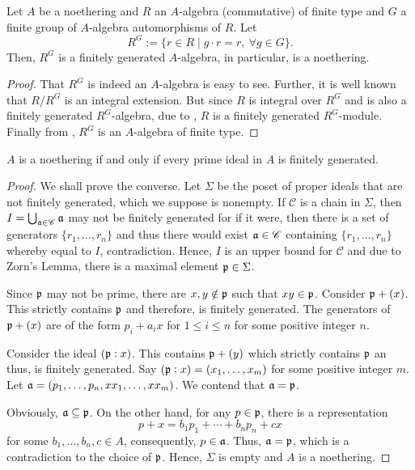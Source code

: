 \begin{corollary}[Noether]
    Let $A$ be a noethering and $R$ an $A$-algebra (commutative) of finite type and $G$ a finite group of $A$-algebra automorphisms of $R$. Let 
    \begin{equation*}
        R^G := \{r\in R\mid g\cdot r = r,~\forall g\in G\}.
    \end{equation*}
    Then, $R^G$ is a finitely generated $A$-algebra, in particular, is a noethering.
\end{corollary}
\begin{proof}
    That $R^G$ is indeed an $A$-algebra is easy to see. Further, it is well known that $R/R^G$ is an integral extension. But since $R$ is integral over $R^G$ and is also a finitely generated $R^G$-algebra, due to , $R$ is a finitely generated $R^G$-module. Finally from , $R^G$ is an $A$-algebra of finite type.
\end{proof}

\begin{lemma}[Cohen]
    $A$ is a noethering if and only if every prime ideal in $A$ is finitely generated.
\end{lemma}
\begin{proof}
    We shall prove the converse. Let $\Sigma$ be the poset of proper ideals that are not finitely generated, which we suppose is nonempty. If $\mathscr C$ is a chain in $\Sigma$, then $I = \bigcup_{\mathfrak a\in\mathscr C}\mathfrak a$ may not be finitely generated for if it were, then there is a set of generators $\{r_1,\ldots,r_n\}$ and thus there would exist $\mathfrak a\in\mathscr C$ containing $\{r_1,\ldots,r_n\}$ whereby equal to $I$, contradiction. Hence, $I$ is an upper bound for $\mathscr C$ and due to Zorn's Lemma, there is a maximal element $\mathfrak p\in\Sigma$.

    Since $\mathfrak p$ may not be prime, there are $x,y\notin\mathfrak p$ such that $xy\in\mathfrak p$. Consider $\mathfrak p + (x)$. This strictly contains $\mathfrak p$ and therefore, is finitely generated. The generators of $\mathfrak p + (x)$ are of the form $p_i + a_ix$ for $1\le i\le n$ for some positive integer $n$. 

    Consider the ideal $(\mathfrak p: x)$. This contains $\mathfrak p + (y)$ which strictly contains $\mathfrak p$ an thus, is finitely generated. Say $(\mathfrak p: x) = (x_1,\ldots,x_m)$ for some positive integer $m$. Let $\mathfrak a = (p_1,\ldots,p_n,xx_1,\ldots,xx_m)$. We contend that $\mathfrak a = \mathfrak p$.

    Obviously, $\mathfrak a\subseteq\mathfrak p$. On the other hand, for any $p\in\mathfrak p$, there is a representation 
    \begin{equation*}
        p + x = b_1p_1 + \cdots + b_np_n + cx
    \end{equation*}
    for some $b_1,\ldots,b_n,c\in A$, consequently, $p\in\mathfrak a$. Thus, $\mathfrak a = \mathfrak p$, which is a contradiction to the choice of $\mathfrak p$. Hence, $\Sigma$ is empty and $A$ is a noethering.
\end{proof}

